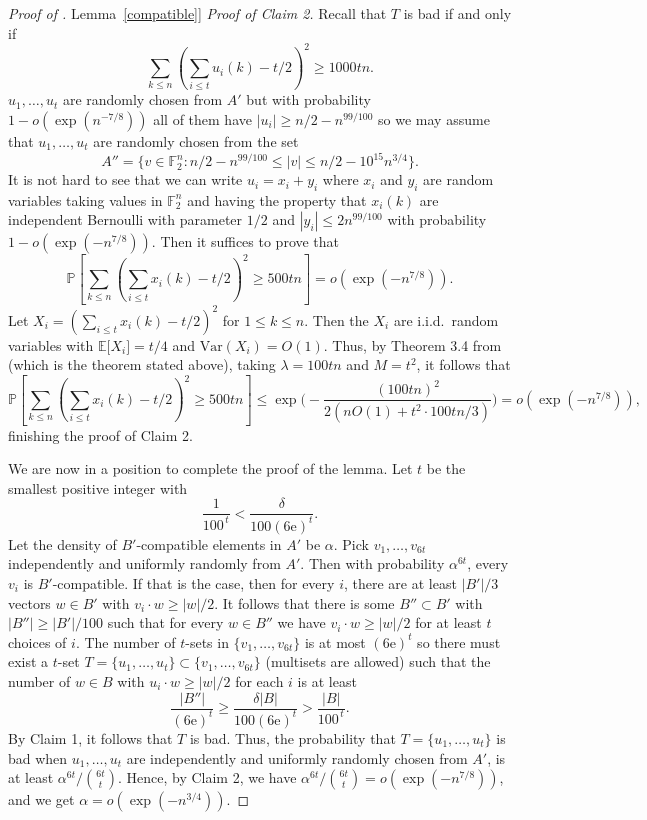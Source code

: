 \documentclass[11pt]{article}
\numberwithin{equation}{section}
\theoremstyle{definition}
\theoremstyle{plain}
\newcommand{\eee}{\mathrm e}
\newcommand{\expref}[2]{\hyperref[#2]{#1~\ref{#2}}}
\newcommand\E{\mathbb{E}}
\renewcommand\P{\mathbb{P}}
\newcommand\F{\mathbb{F}}
\renewcommand\a{\alpha}
\renewcommand\d{\delta}
\begin{document}
\begin{proof}[Proof of \expref{Lemma}{compatible}]
	\noindent \emph{Proof of Claim 2.} Recall that $T$ is bad if and only if
        \[
          \sum_{k\leq n}\left(\sum_{i\leq t}u_i(k)-t/2\right)^2\geq 1000tn.
        \]
        $u_1,\dots,u_t$ are randomly chosen from $A'$ but with
        probability $1-o(\exp(n^{-7/8}))$ all of them have
        $|u_i|\geq n/2-n^{99/100}$ so we may assume that
        $u_1,\dots,u_t$ are randomly chosen from the set
        \[
          A''=\{v\in \F_2^n: n/2-n^{99/100}\leq |v|\leq
          n/2-10^{15}n^{3/4}\}.
        \]
        It is not hard to see that we can write
        $u_i=x_i+y_i$ where $x_i$ and $y_i$ are random variables
        taking values in $\F_2^{n}$ and having the property that
        $x_i(k)$ are independent Bernoulli with parameter $1/2$ and
        $|y_i|\leq 2n^{99/100}$ with probability
        $1-o(\exp(-n^{7/8}))$. Then it suffices to prove
        that
        \[
          \P\left\lbrack\sum_{k\leq n}\left(\sum_{i\leq t}x_i(k)-t/2\right)^2\geq
          500tn\right\rbrack=o(\exp(-n^{7/8})).
        \]
        Let
        $X_i=(\sum_{i\leq t} x_i(k)-t/2)^2$ for $1\leq k\leq n$. Then
        the $X_i$ are i.i.d.\ random variables with
        $\E \lbrack X_i\rbrack=t/4$ and $\text{Var}(X_i)=O(1)$. Thus,
        by Theorem 3.4 from \cite{chunglu} (which is the theorem
        stated above), taking $\lambda=100tn$ and $M=t^2$, it follows
        that
        \[
          \P\left\lbrack\sum_{k\leq n}\left(\sum_{i\leq t}x_i(k)-t/2\right)^2\geq
        500tn\right\rbrack\leq
        \exp\bigg(-\frac{(100tn)^2}{2(nO(1)+t^2\cdot100tn/3)}\bigg)=
        o(\exp(-n^{7/8})),
      \]
      finishing the proof of Claim 2.
	
	\smallskip
	
	We are now in a position to complete the proof of the lemma. Let $t$ be the
        smallest positive integer with
        \[
          \frac{1}{100^{\,t}}<\frac{\d}{100(6\eee)^t}.
        \]
        Let the density of $B'$-compatible elements in $A'$ be $\alpha$. Pick $v_1,\dots,v_{6t}$ independently and uniformly randomly from $A'$. Then with probability $\alpha^{6t}$, every $v_i$ is $B'$-compatible. If that is the case, then for every $i$, there are at least $|B'|/3$ vectors $w\in B'$ with $v_i\cdot w\geq |w|/2$. It follows that there is some $B''\subset B'$ with $|B''|\geq |B'|/100$ such that for every $w\in B''$ we have $v_i\cdot w\geq |w|/2$ for at least $t$ choices of $i$. The number of $t$-sets in $\{v_1,\dots,v_{6t}\}$ is at most $(6\eee)^{t}$ so there must exist a $t$-set $T=\{u_1,\dots,u_t\}\subset \{v_1,\dots,v_{6t}\}$ (multisets are allowed) such that the number of $w\in B$ with $u_i\cdot w\geq |w|/2$ for each $i$ is at least
  \[
   \frac{|B''|}{(6\eee)^{t}} \geq\frac{\delta|B|}{100(6\eee)^{t}}> \frac{|B|}{100^{\,t}}.
  \]
        By Claim 1, it follows that $T$ is bad. Thus, the probability that $T=\{u_1,\dots,u_t\}$ is bad when $u_1,\dots,u_t$ are independently and uniformly randomly chosen from $A'$, is at least ${\a^{6t}}/{\binom{6t}{t}}$. Hence, by Claim 2, we have ${\a^{6t}}/{\binom{6t}{t}}=o(\exp(-n^{7/8}))$, and we get $\alpha=o(\exp(-n^{3/4}))$.
\end{proof}
\end{document}
